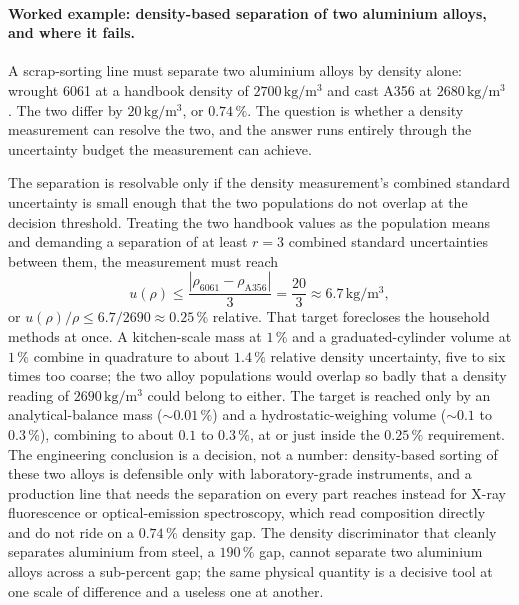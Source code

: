 \paragraph{Worked example: density-based separation of two aluminium
alloys, and where it fails.}
A scrap-sorting line must separate two aluminium alloys by density
alone: wrought 6061 at a handbook density of
$2700 \,\si{\kilogram\per\meter\cubed}$ and cast A356 at
$2680 \,\si{\kilogram\per\meter\cubed}$
\cite{text:ashby2017}. The two differ by
$20 \,\si{\kilogram\per\meter\cubed}$, or $0.74\,\%$. The question
is whether a density measurement can resolve the two, and the answer
runs entirely through the uncertainty budget the measurement can
achieve.

The separation is resolvable only if the density measurement's
combined standard uncertainty is small enough that the two
populations do not overlap at the decision threshold. Treating the
two handbook values as the population means and demanding a
separation of at least $r = 3$ combined standard uncertainties
between them, the measurement must reach
\[
u(\rho) \leq \frac{|\rho_{6061} - \rho_{\mathrm{A356}}|}{3}
= \frac{20}{3} \approx 6.7 \,\si{\kilogram\per\meter\cubed},
\]
or $u(\rho)/\rho \leq 6.7 / 2690 \approx 0.25\,\%$ relative. That
target forecloses the household methods at once. A kitchen-scale mass
at $1\,\%$ and a graduated-cylinder volume at $1\,\%$ combine in
quadrature to about $1.4\,\%$ relative density uncertainty, five to
six times too coarse; the two alloy populations would overlap so
badly that a density reading of $2690 \,\si{\kilogram\per\meter
\cubed}$ could belong to either. The target is reached only by an
analytical-balance mass ($\sim 0.01\,\%$) and a hydrostatic-weighing
volume ($\sim 0.1$ to $0.3\,\%$), combining to about $0.1$ to
$0.3\,\%$, at or just inside the $0.25\,\%$ requirement. The
engineering conclusion is a decision, not a number: density-based
sorting of these two alloys is defensible only with laboratory-grade
instruments, and a production line that needs the separation on
every part reaches instead for X-ray fluorescence or optical-emission
spectroscopy, which read composition directly and do not ride on a
$0.74\,\%$ density gap. The density discriminator that cleanly
separates aluminium from steel, a $190\,\%$ gap, cannot separate two
aluminium alloys across a sub-percent gap; the same physical quantity
is a decisive tool at one scale of difference and a useless one at
another.

